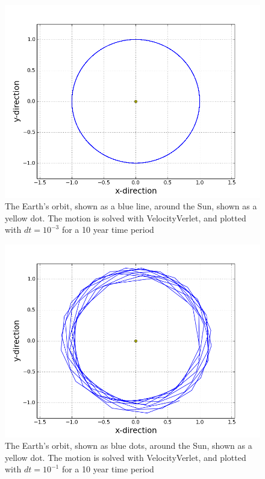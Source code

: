\documentclass[norsk,a4paper,12pt]{article}
\begin{document}
{\begin{figure} [H]
    \centering
    \includegraphics[scale=0.6]{oppg_3c_sun_earth_verlet_dt=10(-3)}
    \caption{The Earth's orbit, shown as a blue line, around the Sun, shown as a yellow dot. The motion is solved with VelocityVerlet, and plotted with $dt = 10^{-3}$ for a 10 year time period}
    \label{fig:EarthOrbit_Verlet_det = 10(-3)}
\end{figure}

\begin{figure} [H]
    \centering
    \includegraphics[scale=0.6]{oppg_3c_sun_earth_verlet_dt=10(-1)}
    \caption{The Earth's orbit, shown as blue dots, around the Sun, shown as a yellow dot. The motion is solved with VelocityVerlet, and plotted with $dt = 10^{-1}$ for a 10 year time period}
    \label{fig:EarthOrbit_Verlet_det = 10(-1)}
\end{figure}

}
\end{document}
